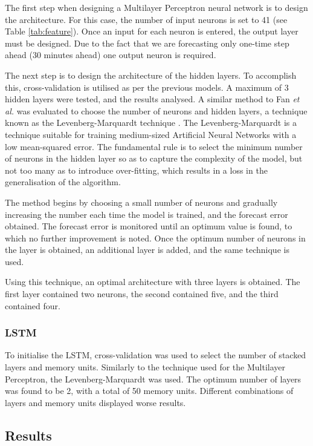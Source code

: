 The first step when designing a Multilayer Perceptron neural network is to design the architecture. For this case, the number of input neurons is set to 41 (see Table \ref{tab:feature}). Once an input for each neuron is entered, the output layer must be designed. Due to the fact that we are forecasting only one-time step ahead (30 minutes ahead) one output neuron is required.

The next step is to design the architecture of the hidden layers. To accomplish this, cross-validation is utilised as per the previous models. A maximum of 3 hidden layers were tested, and the results analysed. A similar method to Fan \textit{et al.}  \cite{Fan2009} was evaluated to choose the number of neurons and hidden layers, a technique known as the Levenberg-Marquardt technique \cite{more1978levenberg}. The Levenberg-Marquardt is a technique suitable for training medium-sized Artificial Neural Networks with a low mean-squared error. The fundamental rule is to select the minimum number of neurons in the hidden layer so as to capture the complexity of the model, but not too many as to introduce over-fitting, which results in a loss in the generalisation of the algorithm.

The method begins by choosing a small number of neurons and gradually increasing the number each time the model is trained, and the forecast error obtained. The forecast error is monitored until an optimum value is found, to which no further improvement is noted. Once the optimum number of neurons in the layer is obtained, an additional layer is added, and the same technique is used.

Using this technique, an optimal architecture with three layers is obtained. The first layer contained two neurons, the second contained five, and the third contained four.



\subsubsection{LSTM}

To initialise the LSTM, cross-validation was used to select the number of stacked layers and memory units. Similarly to the technique used for the Multilayer Perceptron, the Levenberg-Marquardt was used. The optimum number of layers was found to be 2, with a total of 50 memory units. Different combinations of layers and memory units displayed worse results.



\subsection{Results}



